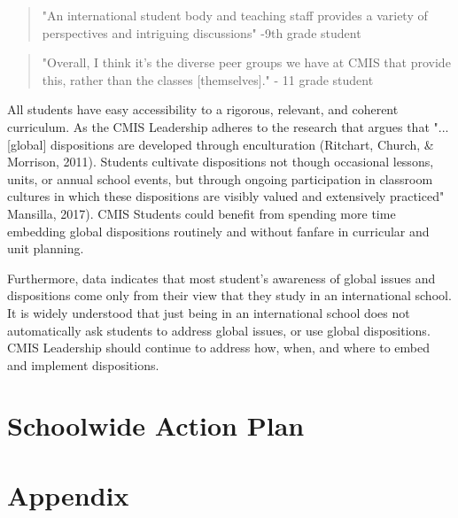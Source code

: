 \documentclass{report}
\begin{document}
\begin{findings}
\blockquote{"An international student body and teaching staff provides a variety of perspectives and intriguing discussions" -9th grade student}

\blockquote{"Overall, I think it's the diverse peer groups we have at CMIS that provide this, rather than the classes [themselves]." - 11 grade student}



All students have easy accessibility to a rigorous, relevant, and coherent curriculum.  As the CMIS Leadership adheres to the research that argues that   "...[global] dispositions are developed through enculturation (Ritchart, Church, \& Morrison, 2011). Students cultivate dispositions not though occasional lessons, units, or annual school events, but through ongoing participation in classroom cultures in which these dispositions are visibly valued and extensively practiced" Mansilla, 2017). CMIS Students could benefit from spending more time embedding global dispositions routinely and without fanfare in curricular and unit planning. 

Furthermore, data indicates that most student's awareness of global issues and dispositions come only from their view that they study in an international school. It is widely understood that just being in an international school does not automatically ask students to address global issues, or use global dispositions. CMIS Leadership should continue to address how, when, and where to embed and implement dispositions.  
\end{findings}
\chapter{Schoolwide Action Plan}
\chapter{Appendix}
\listoffigures
\listoftables
\end{document}

